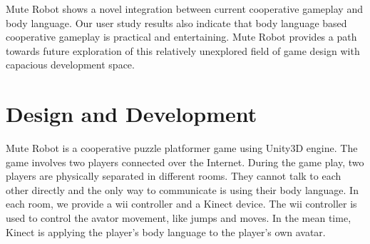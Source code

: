 \documentclass{chi-ext}
\begin{document}

Mute Robot shows a novel integration between current cooperative gameplay and body language. Our user study results also indicate that body language based cooperative gameplay is practical and entertaining. 
Mute Robot provides a path towards future exploration of this relatively unexplored field of game design with capacious development space.

 
  
\section{Design and Development}
Mute Robot is a cooperative puzzle platformer game using Unity3D\cite{Unity3D} engine. 
The game involves two players connected over the Internet. During the game play, two players are physically separated in different rooms. 
They cannot talk to each other directly and the only way to communicate is using their body language. 
In each room, we provide a wii\cite{Wii} controller and a Kinect device. 
The wii controller is used to control the avator movement, like jumps and moves. 
In the mean time, Kinect is applying the player's body language to the player's own avatar. 
\end{document}
